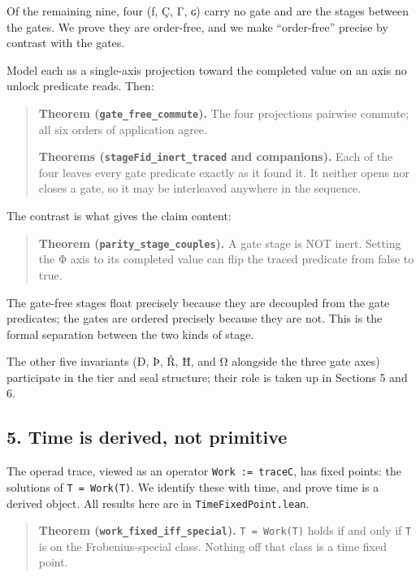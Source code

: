 \documentclass[12pt,a4paper]{article}
\begin{document}
Of the remaining nine, four (ƒ, Ç, Γ, ɢ) carry no gate and are the
stages between the gates. We prove they are order-free, and we make
``order-free'' precise by contrast with the gates.

Model each as a single-axis projection toward the completed value on an
axis no unlock predicate reads. Then:

\begin{quote}
\textbf{Theorem (\texttt{gate\_free\_commute}).} The four projections
pairwise commute; all six orders of application agree.

\textbf{Theorems (\texttt{stageFid\_inert\_traced} and companions).}
Each of the four leaves every gate predicate exactly as it found it. It
neither opens nor closes a gate, so it may be interleaved anywhere in
the sequence.
\end{quote}

The contrast is what gives the claim content:

\begin{quote}
\textbf{Theorem (\texttt{parity\_stage\_couples}).} A gate stage is NOT
inert. Setting the Φ axis to its completed value can flip the traced
predicate from false to true.
\end{quote}

The gate-free stages float precisely because they are decoupled from the
gate predicates; the gates are ordered precisely because they are not.
This is the formal separation between the two kinds of stage.

The other five invariants (Ð, Þ, Ř, Ħ, and Ω alongside the three gate
axes) participate in the tier and seal structure; their role is taken up
in Sections 5 and 6.

\hypertarget{time-is-derived-not-primitive}{%
\subsection{5. Time is derived, not
primitive}\label{time-is-derived-not-primitive}}

The operad trace, viewed as an operator \texttt{Work\ :=\ traceC}, has
fixed points: the solutions of \texttt{T\ =\ Work(T)}. We identify these
with time, and prove time is a derived object. All results here are in
\texttt{TimeFixedPoint.lean}.

\begin{quote}
\textbf{Theorem (\texttt{work\_fixed\_iff\_special}).}
\texttt{T\ =\ Work(T)} holds if and only if \texttt{T} is on the
Frobenius-special class. Nothing off that class is a time fixed point.
\end{quote}
\end{document}
